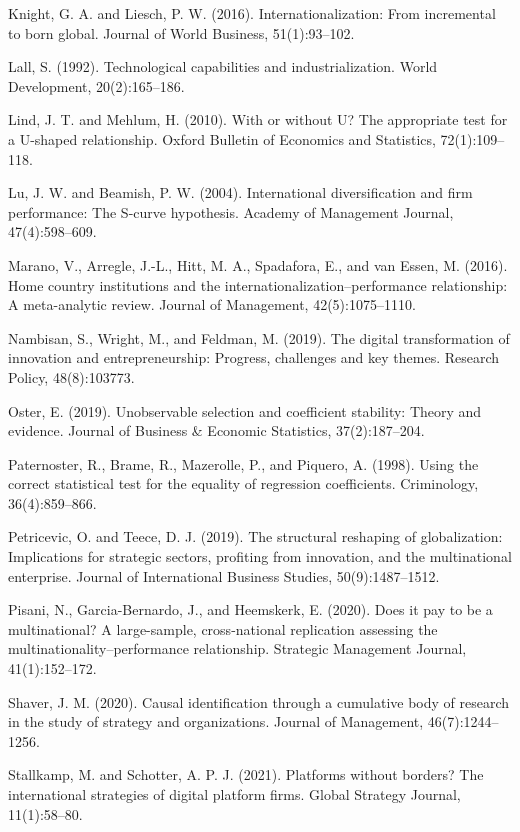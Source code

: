 \documentclass[12pt,a4paper]{article}
\begin{document}
Knight, G. A. and Liesch, P. W. (2016). Internationalization: From
incremental to born global. Journal of World Business, 51(1):93--102.

Lall, S. (1992). Technological capabilities and industrialization. World
Development, 20(2):165--186.

Lind, J. T. and Mehlum, H. (2010). With or without U? The appropriate
test for a U-shaped relationship. Oxford Bulletin of Economics and
Statistics, 72(1):109--118.

Lu, J. W. and Beamish, P. W. (2004). International diversification and
firm performance: The S-curve hypothesis. Academy of Management Journal,
47(4):598--609.

Marano, V., Arregle, J.-L., Hitt, M. A., Spadafora, E., and van Essen,
M. (2016). Home country institutions and the
internationalization--performance relationship: A meta-analytic review.
Journal of Management, 42(5):1075--1110.

Nambisan, S., Wright, M., and Feldman, M. (2019). The digital
transformation of innovation and entrepreneurship: Progress, challenges
and key themes. Research Policy, 48(8):103773.

Oster, E. (2019). Unobservable selection and coefficient stability:
Theory and evidence. Journal of Business \& Economic Statistics,
37(2):187--204.

Paternoster, R., Brame, R., Mazerolle, P., and Piquero, A. (1998). Using
the correct statistical test for the equality of regression
coefficients. Criminology, 36(4):859--866.

Petricevic, O. and Teece, D. J. (2019). The structural reshaping of
globalization: Implications for strategic sectors, profiting from
innovation, and the multinational enterprise. Journal of International
Business Studies, 50(9):1487--1512.

Pisani, N., Garcia-Bernardo, J., and Heemskerk, E. (2020). Does it pay
to be a multinational? A large-sample, cross-national replication
assessing the multinationality--performance relationship. Strategic
Management Journal, 41(1):152--172.

Shaver, J. M. (2020). Causal identification through a cumulative body of
research in the study of strategy and organizations. Journal of
Management, 46(7):1244--1256.

Stallkamp, M. and Schotter, A. P. J. (2021). Platforms without borders?
The international strategies of digital platform firms. Global Strategy
Journal, 11(1):58--80.
\end{document}
